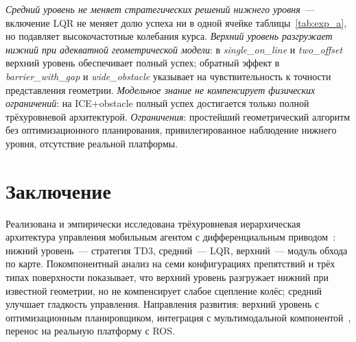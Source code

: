 \documentclass[11pt]{article}
\begin{document}
\textit{Средний уровень не меняет стратегических решений нижнего уровня}~--- включение LQR не меняет долю успеха ни в одной ячейке таблицы~\ref{tab:exp_a}, но подавляет высокочастотные колебания курса. \textit{Верхний уровень разгружает нижний при адекватной геометрической модели}: в \emph{single\_on\_line} и \emph{two\_offset} верхний уровень обеспечивает полный успех; обратный эффект в \emph{barrier\_with\_gap} и \emph{wide\_obstacle} указывает на чувствительность к точности представления геометрии. \textit{Модельное знание не компенсирует физических ограничений}: на ICE+obstacle полный успех достигается только полной трёхуровневой архитектурой. \textit{Ограничения}: простейший геометрический алгоритм без оптимизационного планирования, привилегированное наблюдение нижнего уровня, отсутствие реальной платформы.

\section{Заключение}
\label{sec:conclusion}

Реализована и эмпирически исследована трёхуровневая иерархическая архитектура управления мобильным агентом с дифференциальным приводом~\cite{kiselev2020dissertation,kiselev2020}: нижний уровень~--- стратегия TD3, средний~--- LQR, верхний~--- модуль обхода по карте. Покомпонентный анализ на семи конфигурациях препятствий и трёх типах поверхности показывает, что верхний уровень разгружает нижний при известной геометрии, но не компенсирует слабое сцепление колёс; средний улучшает гладкость управления. Направления развития: верхний уровень с оптимизационным планировщиком, интеграция с мультимодальной компонентой~\cite{veitsenfeld2024}, перенос на реальную платформу с ROS.
\end{document}
